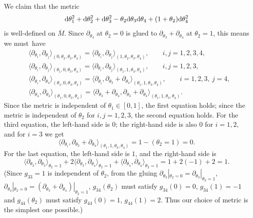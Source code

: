 \documentclass[pdftex]{sigma}
\numberwithin{equation}{section}
\theoremstyle{definition}
\newcommand{\om}{\overline{M}}
\begin{document}
We claim that the metric
\begin{equation*}
{\rm d}\theta_1^2 + {\rm d}\theta_2^2 + {\rm d}\theta_3^2 -\theta_2{\rm d}\theta_3 {\rm d}\theta_4 + (1+\theta_2){\rm d}\theta_4^2
\end{equation*}
is well-defined on $\om$.
Since $\partial_{\theta_4}$ at $\theta_2=0$ is glued to
$\partial_{\theta_3} + \partial_{\theta_4}$ at $\theta_2 = 1$, this means we must~have%
\begin{align*}
&\langle \partial_{\theta_i},\partial_{\theta_j}\rangle_{(0,\theta_2,\theta_3,\theta_4)}
= \langle \partial_{\theta_i},\partial_{\theta_j}\rangle_{(1,\theta_2,\theta_3,\theta_4)},
\qquad i,j = 1,2,3,4,\\
&\langle \partial_{\theta_i},\partial_{\theta_j}\rangle_{(\theta_1,0,\theta_3,\theta_4)}
= \langle \partial_{\theta_i},\partial_{\theta_j}\rangle_{(\theta_1,1,\theta_3,\theta_4)},\qquad i, j = 1, 2, 3,\\
&\langle \partial_{\theta_i},\partial_{\theta_4}\rangle_{(\theta_1,0,\theta_3,\theta_4)}
= \langle \partial_{\theta_i},\partial_{\theta_3} + \partial_{\theta_4}\rangle_{(\theta_1,1,\theta_3,\theta_4)},\qquad
i = 1,2,3,\ j = 4,\\
&\langle \partial_{\theta_4},\partial_{\theta_4}\rangle_{(\theta_1,0,\theta_3,\theta_4)}
= \langle \partial_{\theta_3} + \partial_{\theta_4},\partial_{\theta_3} + \partial_{\theta_4}\rangle_{(\theta_1,1,\theta_3,\theta_4)}.
\end{align*}
Since the metric is independent of $\theta_1\in [0,1]$, the first equation holds; since
the metric is independent of $\theta_2$ for $i,j = 1,2,3$, the second equation holds.
 For the third equation, the left-hand side is $0$; the right-hand side is also $0$ for $i=1,2$, and for $i=3$ we get
\[\langle \partial_{\theta_i},\partial_{\theta_3} + \partial_{\theta_4}\rangle_{(\theta_1,1,\theta_3,\theta_4)}
= 1 - (\theta_2 = 1) = 0.\]
For the last equation, the left-hand side is $1$, and the right-hand side is
\[\langle\partial_{\theta_3},\partial_{\theta_3}\rangle_{\theta_2=1} +
2\langle\partial_{\theta_3},\partial_{\theta_4}\rangle_{\theta_2=1} +
\langle\partial_{\theta_4},\partial_{\theta_4}\rangle_{\theta_2=1}
= 1 +2 (-1) + 2 = 1.\]
(Since $g_{33} = 1$ is independent of $\theta_2$, from the gluing
$\partial_{\theta_3}|_{\theta_2=0} = \partial_{\theta_3}|_{\theta_2=1}$, $\partial_{\theta_4}|_{\theta_2=0} = (\partial_{\theta_3}+\partial_{\theta_4})|_{\theta_2=1}$,
$g_{34}(\theta_2)$ must satisfy $g_{34}(0) = 0$, $g_{34}(1) = -1$ and $g_{44}(\theta_2)$ must satisfy $g_{44}(0) = 1$, $g_{44}(1) = 2$. Thus our choice of metric is the simplest one possible.)
\end{document}
